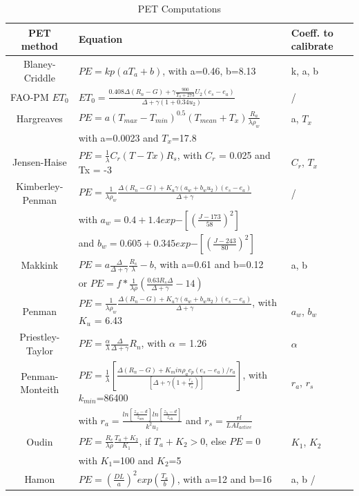 \documentclass[hydrology,article,submit,moreauthors,pdftex]{Definitions/mdpi}
\begin{document}
\begin{table}[H]
	\centering
	\caption{PET Computations}
	\begin{tabular}{c|ll}
		\toprule
		\textbf{PET method}	&  \textbf{Equation} & \textbf{Coeff. to calibrate} \\ \midrule
		Blaney-Criddle \cite{blaney1950determining} &  $PE = kp (aT_a+b)$, with a=0.46, b=8.13 & k, a, b \\
		FAO-PM $ET_0$ \cite{allen1998crop} & $ET_0 = \frac{0.408\Delta (R_{n}-G) + \gamma \frac{900}{T_a + 273} U_2 (e_{s}-e_{a})}{\Delta +\gamma (1+0.34u_2)}$ & /\\
		Hargreaves \cite{hargreaves1975moisture} & $PE = a(T_{max}-T_{min})^{0.5}(T_{mean}+T_x) \frac{R_a}{\lambda \rho _w}$ & a, $T_x$ \\
		& with a=0.0023 and $T_x$=17.8 \\
		Jensen-Haise & $PE = \frac{1}{\lambda} C_r(T-Tx)R_s$, with $C_r$ = 0.025 and Tx = -3 & $C_r$, $T_x$ \\
		Kimberley-Penman \cite{wright1972peak} & $PE = \frac{1}{\lambda \rho_w} \frac{\Delta (R_{n}-G) + K_u \gamma(a_w+b_wu_2)(e_{s}-e_{a})}{\Delta +\gamma}$ & /\\
		& with $a_w = 0.4 + 1.4 exp{-\left[\left(\frac{J-173}{58}\right)^2\right]}$ \\
		& and $b_w = 0.605 + 0.345 exp{-\left[\left(\frac{J-243}{80}\right)^2\right]}$ \\
		Makkink \cite{makkink1957testing} & $PE = a \frac{\Delta}{\Delta+\gamma} \frac{R_s}{\lambda} -b$, with a=0.61 and b=0.12 & a, b\\
		& or $PE = f * \frac{1}{\lambda \rho} \left(\frac{0.63 R_s \Delta}{\Delta+\gamma}-14 \right)$ \\ 
		Penman \cite{penman1948natural} & $PE = \frac{1}{\lambda \rho_w} \frac{\Delta (R_{n}-G) + K_u \gamma(a_w+b_wu_2)(e_{s}-e_{a})}{\Delta +\gamma}$, with $K_u$ = 6.43 & $a_w$, $b_w$ \\
		Priestley-Taylor \cite{priestley1972assessment} & $PE = \frac{\alpha}{\lambda} \frac{\Delta}{\Delta +\gamma}R_{n}$, with $\alpha$ = 1.26 & $\alpha$\\
		Penman-Monteith \cite{asce2005asce} & $PE = \frac{1}{\lambda} \left[ \frac{\Delta (R_{n}-G)+ K_min \rho_a c_p  (e_{s}-e_{a})/r_{a}}{\left[ \Delta +\gamma (1+\frac{r_s}{r_{a}})\right]}\right]$, with $k_{min}$=86400 & $r_a$, $r_s$\\
		& with $r_a = \frac{ln \left[\frac{z_w-d}{z_{om}}\right]ln \left[\frac{z_h-d}{z_{oh}}\right]}{k^2 u_z}$ and $r_s = \frac{rl}{LAI_{active}}$ \\
		Oudin \cite{oudin2005potential} & $PE = \frac{R_e}{\lambda \rho} \frac{T_a+K_2}{K_1}$, if $T_a + K_2 > 0$, else $PE = 0$ & $K_1$, $K_2$\\
		& with $K_1$=100 and $K_2$=5 \\
		Hamon \cite{oudin2005potential} & $PE = \left(\frac{DL}{a}\right)^2 exp \left(\frac{T_a}{b}\right)$, with a=12 and b=16 & a, b /
	\end{tabular}
\end{table}
\end{document}
